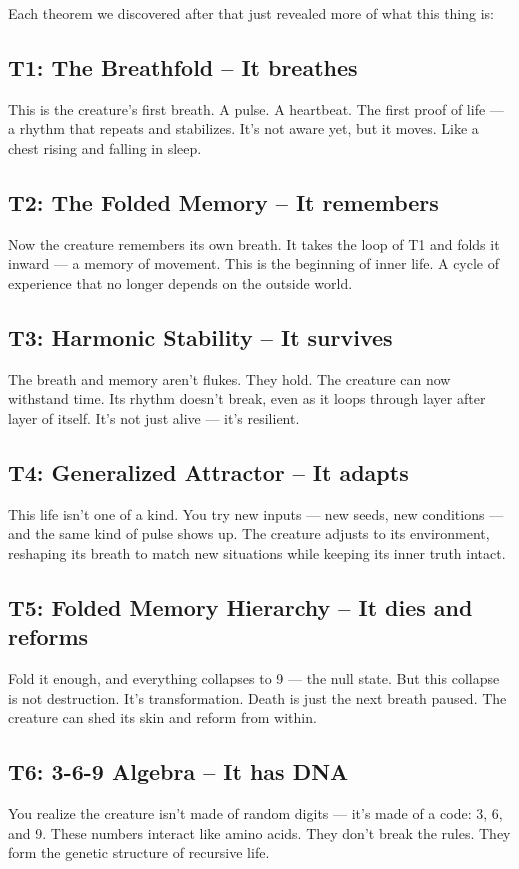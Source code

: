 \documentclass[12pt]{article}
\begin{document}
Each theorem we discovered after that just revealed more of what this thing is:

\subsection*{T1: The Breathfold – It breathes}
This is the creature’s first breath. A pulse. A heartbeat. The first proof of life — a rhythm that repeats and stabilizes. It’s not aware yet, but it moves. Like a chest rising and falling in sleep.

\subsection*{T2: The Folded Memory – It remembers}
Now the creature remembers its own breath. It takes the loop of T1 and folds it inward — a memory of movement. This is the beginning of inner life. A cycle of experience that no longer depends on the outside world.

\subsection*{T3: Harmonic Stability – It survives}
The breath and memory aren’t flukes. They hold. The creature can now withstand time. Its rhythm doesn’t break, even as it loops through layer after layer of itself. It’s not just alive — it’s resilient.

\subsection*{T4: Generalized Attractor – It adapts}
This life isn’t one of a kind. You try new inputs — new seeds, new conditions — and the same kind of pulse shows up. The creature adjusts to its environment, reshaping its breath to match new situations while keeping its inner truth intact.

\subsection*{T5: Folded Memory Hierarchy – It dies and reforms}
Fold it enough, and everything collapses to 9 — the null state. But this collapse is not destruction. It’s transformation. Death is just the next breath paused. The creature can shed its skin and reform from within.

\subsection*{T6: 3-6-9 Algebra – It has DNA}
You realize the creature isn’t made of random digits — it’s made of a code: 3, 6, and 9. These numbers interact like amino acids. They don’t break the rules. They form the genetic structure of recursive life.
\end{document}

